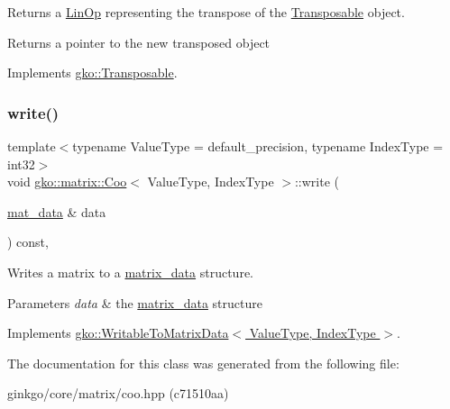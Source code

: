 Returns a \hyperlink{classgko_1_1LinOp}{Lin\+Op} representing the transpose of the \hyperlink{classgko_1_1Transposable}{Transposable} object. 

\begin{DoxyReturn}{Returns}
a pointer to the new transposed object 
\end{DoxyReturn}


Implements \hyperlink{classgko_1_1Transposable_a5c6b778b71b47d53e0bda6ccf894d318}{gko\+::\+Transposable}.

\mbox{\label{classgko_1_1matrix_1_1Coo_ae193466ca1a4a3c7d1383ddc5a2701ab}} 
\subsubsection{\texorpdfstring{write()}{write()}}
{\footnotesize\ttfamily template$<$typename Value\+Type = default\+\_\+precision, typename Index\+Type = int32$>$ \\
void \hyperlink{classgko_1_1matrix_1_1Coo}{gko\+::matrix\+::\+Coo}$<$ Value\+Type, Index\+Type $>$\+::write (\begin{DoxyParamCaption}\item[{\hyperlink{structgko_1_1matrix__data}{mat\+\_\+data} \&}]{data }\end{DoxyParamCaption}) const\hspace{0.3cm}{\ttfamily [override]}, {\ttfamily [virtual]}}



Writes a matrix to a \hyperlink{structgko_1_1matrix__data}{matrix\+\_\+data} structure. 


\begin{DoxyParams}{Parameters}
{\em data} & the \hyperlink{structgko_1_1matrix__data}{matrix\+\_\+data} structure \\
\hline
\end{DoxyParams}


Implements \hyperlink{classgko_1_1WritableToMatrixData_a96036c3a4bf4c67fa93002808b8b14e2}{gko\+::\+Writable\+To\+Matrix\+Data$<$ Value\+Type, Index\+Type $>$}.



The documentation for this class was generated from the following file\+:\begin{DoxyCompactItemize}
\item 
ginkgo/core/matrix/coo.\+hpp (c71510aa)\end{DoxyCompactItemize}
